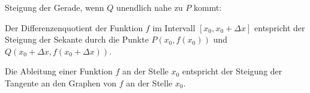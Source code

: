 \begin{minipage}{0.6\textwidth}
\begin{center}
    \end{center}
\end{minipage}
\begin{minipage}{0.4\textwidth}
    Steigung der Gerade, wenn $Q$ unendlich nahe zu $P$ kommt:
\end{minipage}
\newpage

\begin{theo}{}
    Der Differenzenquotient der Funktion $f$ im Intervall $[x_0, x_0 + \Delta x]$ entspricht der Steigung der Sekante durch die Punkte $P(x_0, f(x_0))$ und $Q(x_0 + \Delta x, f(x_0 + \Delta x))$.
\end{theo}

\begin{theo}{}
    Die Ableitung einer Funktion $f$ an der Stelle $x_0$ entspricht der Steigung der Tangente an den Graphen von $f$ an der Stelle $x_0$.
\end{theo}
